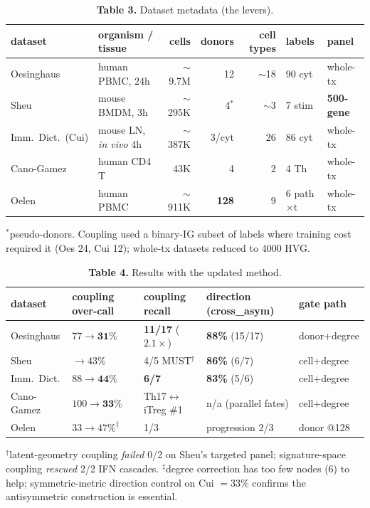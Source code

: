 \documentclass[11pt]{article}
\begin{document}
\begin{table}[h]\centering\small
\caption*{\textbf{Table 3.} Dataset metadata (the levers).}
\begin{tabular}{llrrrll}
\toprule
dataset & organism / tissue & cells & donors & cell types & labels & panel \\
\midrule
Oesinghaus & human PBMC, 24h & $\sim$9.7M & 12 & $\sim$18 & 90 cyt & whole-tx \\
Sheu & mouse BMDM, 3h & $\sim$295K & 4$^\ast$ & $\sim$3 & 7 stim & \textbf{500-gene} \\
Imm.\ Dict.\ (Cui) & mouse LN, \emph{in vivo} 4h & $\sim$387K & 3/cyt & 26 & 86 cyt & whole-tx \\
Cano-Gamez & human CD4 T & 43K & 4 & 2 & 4 Th & whole-tx \\
Oelen & human PBMC & $\sim$911K & \textbf{128} & 9 & 6 path$\times$t & whole-tx \\
\bottomrule
\end{tabular}
\end{table}
\vspace{-0.6em}
{\footnotesize $^\ast$pseudo-donors. Coupling used a binary-IG subset of labels where training cost required it (Oes 24, Cui 12); whole-tx datasets reduced to 4000 HVG.}

\begin{table}[h]\centering\small
\caption*{\textbf{Table 4.} Results with the updated method.}
\begin{tabular}{llll l}
\toprule
dataset & coupling over-call & coupling recall & direction (cross\_asym) & gate path \\
\midrule
Oesinghaus & $77\to\textbf{31}\%$ & \textbf{11/17} ($2.1\times$) & \textbf{88\%} (15/17) & donor+degree \\
Sheu & $\to$43\% & 4/5 MUST$^\dagger$ & \textbf{86\%} (6/7) & cell+degree \\
Imm.\ Dict. & $88\to\textbf{44}\%$ & \textbf{6/7} & \textbf{83\%} (5/6) & cell+degree \\
Cano-Gamez & $100\to\textbf{33}\%$ & Th17$\leftrightarrow$iTreg \#1 & n/a (parallel fates) & cell+degree \\
Oelen & $33\to47\%^\ddagger$ & 1/3 & progression 2/3 & donor @128 \\
\bottomrule
\end{tabular}
\end{table}
\vspace{-0.6em}
{\footnotesize $^\dagger$latent-geometry coupling \emph{failed} 0/2 on Sheu's targeted panel; signature-space coupling \emph{rescued} 2/2 IFN cascades. $^\ddagger$degree correction has too few nodes (6) to help; symmetric-metric direction control on Cui $=33\%$ confirms the antisymmetric construction is essential.}
\end{document}
